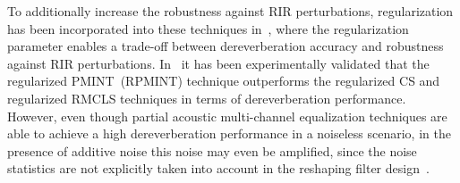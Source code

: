 \documentclass[10pt]{IEEEtran}
\begin{document}
To additionally increase the robustness against RIR perturbations, regularization has been incorporated into these techniques in~\cite{Kodrasi_ITASLP_2013}, where the regularization parameter enables a trade-off between dereverberation accuracy and robustness against RIR perturbations.
{{In~\cite{Kodrasi_ITASLP_2013} it has been experimentally validated that the regularized PMINT~(RPMINT) technique outperforms the regularized CS and regularized RMCLS techniques in terms of dereverberation performance.}}
However, even though partial acoustic multi-channel equalization techniques are able to achieve a high dereverberation performance in a noiseless scenario, in the presence of additive noise this noise may even be amplified, since the noise statistics are not explicitly taken into account in the reshaping filter design~\cite{Kodrasi_ITASLP_2013,Thomas_WASPAA_2011}. 
\end{document}
